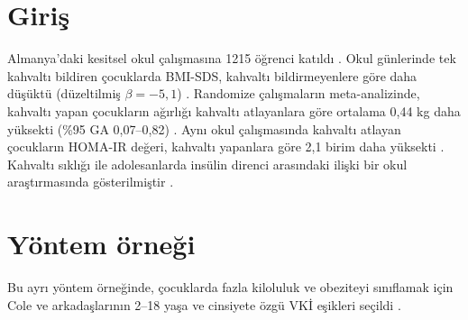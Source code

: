 \documentclass{article}
\begin{document}
\section*{Giriş}

Almanya’daki kesitsel okul çalışmasına 1215 öğrenci katıldı \cite{ober2021}.
Okul günlerinde tek kahvaltı bildiren çocuklarda BMI-SDS, kahvaltı bildirmeyenlere göre daha düşüktü (düzeltilmiş $\beta = -5{,}1$) \cite{ober2021}.
Randomize çalışmaların meta-analizinde, kahvaltı yapan çocukların ağırlığı kahvaltı atlayanlara göre ortalama 0,44 kg daha yüksekti (\%95 GA 0,07--0,82) \cite{sievert2019}.
Aynı okul çalışmasında kahvaltı atlayan çocukların HOMA-IR değeri, kahvaltı yapanlara göre 2,1 birim daha yüksekti \cite{ober2021}.
Kahvaltı sıklığı ile adolesanlarda insülin direnci arasındaki ilişki bir okul araştırmasında gösterilmiştir \cite{kahvalti_demo2026}.

\section*{Yöntem örneği}

Bu ayrı yöntem örneğinde, çocuklarda fazla kiloluluk ve obeziteyi sınıflamak için Cole ve arkadaşlarının 2--18 yaşa ve cinsiyete özgü VKİ eşikleri seçildi \cite{cole2000}.



\end{document}
